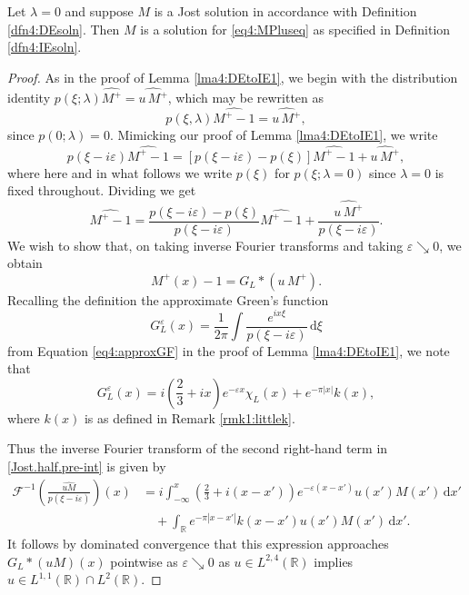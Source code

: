 \documentclass[../dissertation.tex]{subfiles}
\begin{document}
\begin{lma}\label{lma4:DEtoIE2}
	Let $\lambda =0$ and suppose $M$ is a Jost solution in accordance 
	with Definition \ref{dfn4:DEsoln}. Then $M$ is a solution for 
	\ref{eq4:MPluseq} as specified in Definition \ref{dfn4:IEsoln}.
\end{lma}
\begin{proof}
	As in the proof of Lemma \ref{lma4:DEtoIE1}, we begin with the distribution 
	identity $p(\xi;\lambda) \widehat{M^+} = \widehat{u\,M^+}$, which may be rewritten as
	\[ 
		p(\xi,\lambda) \widehat{M^+-1} = \widehat{u\,M^+},
	\]
	since $p(0;\lambda)=0$. Mimicking our proof of Lemma \ref{lma4:DEtoIE1}, we write
	\[ 
		p(\xi-i\varepsilon) \widehat{M^+-1} 
			= \left[ p(\xi-i\varepsilon) - p(\xi) \right] \widehat{M^+-1} 
				+ \widehat{u\,M^+},
	\]
	where here and in what follows we write $p(\xi)$ for $p(\xi; \lambda = 0)$ 
	since $\lambda = 0$ is fixed throughout. Dividing we get
	\begin{equation}
		\label{Jost.half.pre-int}
		\widehat{M^+-1} 
			= \frac{p(\xi-i\varepsilon) - p(\xi)}{p(\xi-i\varepsilon)} 
					\widehat{M^+-1} 
				+ \frac{\widehat{u\,M^+}}{p(\xi-i\varepsilon)}.
	\end{equation}
	We wish to show that, on taking inverse Fourier transforms and taking 
	$\varepsilon \searrow 0$, we obtain
	\[
		M^+(x)-1 = G_L*(u\,M^+).
	\]
	Recalling the definition the approximate Green's function
	\[
		G_L^\varepsilon(x) 
			= \frac{1}{2\pi} \int \frac{e^{ix\xi}}{p(\xi-i\varepsilon)} \, \mathrm{d}\xi
	\]
	from Equation \ref{eq4:approxGF} in the proof of Lemma \ref{lma4:DEtoIE1}, 
	we note that
	\begin{equation}
		\label{GL.eps}
		 G_L^\varepsilon(x) 
		 	= 
		 		i \left(\frac{2}{3} + i x \right)
		 		e^{-\varepsilon x} \chi_L(x) 
		 		+ e^{-\pi|x|} k(x),
	\end{equation}
	where $k(x)$ is as defined in Remark \ref{rmk1:littlek}.

	Thus the inverse Fourier transform of the second right-hand term in 
	\eqref{Jost.half.pre-int} is given by
	\begin{align*}
	\mathcal F^{-1} \left( \frac{\widehat{uM}}{p(\xi-i\varepsilon)} \right)(x)
		&=
			i
			\int_{-\infty}^x 
				\left( \frac{2}{3} + i (x-x') \right) 
				e^{-\varepsilon(x-x')} u(x') M(x') \, \mathrm{d}x' \\
		&\quad + \int_{\mathbb R} e^{-\pi|x-x'|} k(x-x')  u(x') M(x') \, \mathrm{d}x'.
	\end{align*}
	It follows by dominated convergence that this expression approaches
	$G_L*(uM)(x)$ pointwise as $\varepsilon \searrow 0$ as 
	$u\in L^{2,4}(\mathbb R)$ implies 
	$u \in L^{1,1}(\mathbb R) \cap L^2(\mathbb R)$. 


\end{proof}
\end{document}
